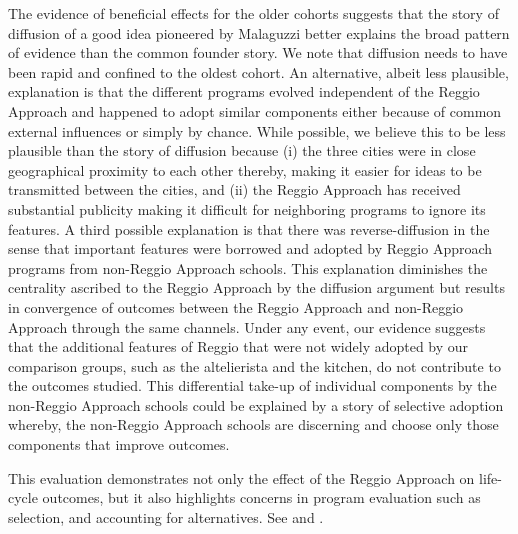 The evidence of beneficial effects for the older cohorts suggests that the story of diffusion of a good idea pioneered by Malaguzzi better explains the broad pattern of evidence than the common founder story. We note that diffusion needs to have been rapid and confined to the oldest cohort. An alternative, albeit less plausible, explanation is that the different programs evolved independent of the Reggio Approach and happened to adopt similar components either because of common external influences or simply by chance. While possible, we believe this to be less plausible than the story of diffusion because (i) the three cities were in close geographical proximity to each other thereby, making it easier for ideas to be transmitted between the cities, and (ii) the Reggio Approach has received substantial publicity making it difficult for neighboring programs to ignore its features. A third possible explanation is that there was reverse-diffusion in the sense that important features were borrowed and adopted by Reggio Approach programs from non-Reggio Approach schools. This explanation diminishes the centrality ascribed to the Reggio Approach by the diffusion argument but results in convergence of outcomes between the Reggio Approach and non-Reggio Approach through the same channels. Under any event, our evidence suggests that the additional features of Reggio that were not widely adopted by our comparison groups, such as the altelierista and the kitchen, do not contribute to the outcomes studied. This differential take-up of individual components by the non-Reggio Approach schools could be explained by a story of selective adoption whereby, the non-Reggio Approach schools are discerning and choose only those components that improve outcomes.

This evaluation demonstrates not only the effect of the Reggio Approach on life-cycle outcomes, but it also highlights concerns in program evaluation such as selection, and accounting for alternatives. See \cite{Heckman_Hohmann_etal_2000_QJE} and \cite{Kline_Walters_2016_QJE}.



